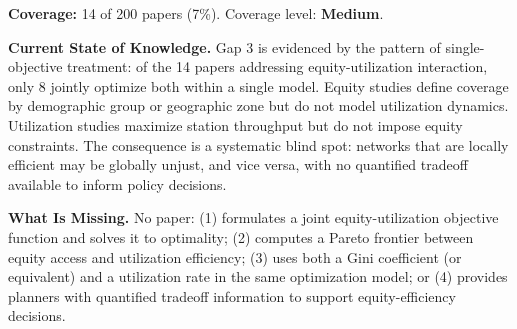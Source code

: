 \documentclass[letterpaper, 12pt, oneside, doublespacing]{Thesis}
\begin{document}
\noindent \textbf{Coverage:} 14 of 200 papers (7\%). Coverage level: \textbf{Medium}.



\noindent \textbf{Current State of Knowledge.} Gap 3 is evidenced by the pattern of single-objective treatment: of the 14 papers addressing equity-utilization interaction, only 8 jointly optimize both within a single model. Equity studies define coverage by demographic group or geographic zone but do not model utilization dynamics. Utilization studies maximize station throughput but do not impose equity constraints. The consequence is a systematic blind spot: networks that are locally efficient may be globally unjust, and vice versa, with no quantified tradeoff available to inform policy decisions.



\noindent \textbf{What Is Missing.} No paper: (1) formulates a joint equity-utilization objective function and solves it to optimality; (2) computes a Pareto frontier between equity access and utilization efficiency; (3) uses both a Gini coefficient (or equivalent) and a utilization rate in the same optimization model; or (4) provides planners with quantified tradeoff information to support equity-efficiency decisions.
\end{document}
